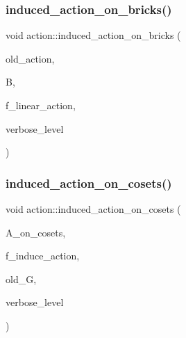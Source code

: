 \mbox{\label{classaction_a71c71472fda2eefb125cd852d5feb306}} 
\subsubsection{\texorpdfstring{induced\+\_\+action\+\_\+on\+\_\+bricks()}{induced\_action\_on\_bricks()}}
{\footnotesize\ttfamily void action\+::induced\+\_\+action\+\_\+on\+\_\+bricks (\begin{DoxyParamCaption}\item[{\mbox{\hyperlink{classaction}{action}} \&}]{old\+\_\+action,  }\item[{\mbox{\hyperlink{classbrick__domain}{brick\+\_\+domain}} $\ast$}]{B,  }\item[{\mbox{\hyperlink{galois_8h_a09fddde158a3a20bd2dcadb609de11dc}{I\+NT}}}]{f\+\_\+linear\+\_\+action,  }\item[{\mbox{\hyperlink{galois_8h_a09fddde158a3a20bd2dcadb609de11dc}{I\+NT}}}]{verbose\+\_\+level }\end{DoxyParamCaption})}

\mbox{\label{classaction_acbdff5ffed42af6a01f07dffb2787237}} 
\subsubsection{\texorpdfstring{induced\+\_\+action\+\_\+on\+\_\+cosets()}{induced\_action\_on\_cosets()}}
{\footnotesize\ttfamily void action\+::induced\+\_\+action\+\_\+on\+\_\+cosets (\begin{DoxyParamCaption}\item[{\mbox{\hyperlink{classaction__on__cosets}{action\+\_\+on\+\_\+cosets}} $\ast$}]{A\+\_\+on\+\_\+cosets,  }\item[{\mbox{\hyperlink{galois_8h_a09fddde158a3a20bd2dcadb609de11dc}{I\+NT}}}]{f\+\_\+induce\+\_\+action,  }\item[{\mbox{\hyperlink{classsims}{sims}} $\ast$}]{old\+\_\+G,  }\item[{\mbox{\hyperlink{galois_8h_a09fddde158a3a20bd2dcadb609de11dc}{I\+NT}}}]{verbose\+\_\+level }\end{DoxyParamCaption})}

